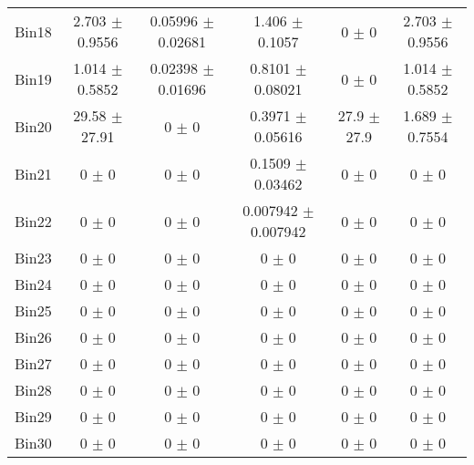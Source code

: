 \begin{tabular}{@{\extracolsep{4pt}}lccccc@{}}
     Bin18 & 2.703 $\pm$ 0.9556 & 0.05996 $\pm$ 0.02681 & 1.406 $\pm$ 0.1057 & 0 $\pm$ 0 & 2.703 $\pm$ 0.9556 \\ 
     Bin19 & 1.014 $\pm$ 0.5852 & 0.02398 $\pm$ 0.01696 & 0.8101 $\pm$ 0.08021 & 0 $\pm$ 0 & 1.014 $\pm$ 0.5852 \\ 
     Bin20 & 29.58 $\pm$ 27.91 & 0 $\pm$ 0 & 0.3971 $\pm$ 0.05616 & 27.9 $\pm$ 27.9 & 1.689 $\pm$ 0.7554 \\ 
     Bin21 & 0 $\pm$ 0 & 0 $\pm$ 0 & 0.1509 $\pm$ 0.03462 & 0 $\pm$ 0 & 0 $\pm$ 0 \\ 
     Bin22 & 0 $\pm$ 0 & 0 $\pm$ 0 & 0.007942 $\pm$ 0.007942 & 0 $\pm$ 0 & 0 $\pm$ 0 \\ 
     Bin23 & 0 $\pm$ 0 & 0 $\pm$ 0 & 0 $\pm$ 0 & 0 $\pm$ 0 & 0 $\pm$ 0 \\ 
     Bin24 & 0 $\pm$ 0 & 0 $\pm$ 0 & 0 $\pm$ 0 & 0 $\pm$ 0 & 0 $\pm$ 0 \\ 
     Bin25 & 0 $\pm$ 0 & 0 $\pm$ 0 & 0 $\pm$ 0 & 0 $\pm$ 0 & 0 $\pm$ 0 \\ 
     Bin26 & 0 $\pm$ 0 & 0 $\pm$ 0 & 0 $\pm$ 0 & 0 $\pm$ 0 & 0 $\pm$ 0 \\ 
     Bin27 & 0 $\pm$ 0 & 0 $\pm$ 0 & 0 $\pm$ 0 & 0 $\pm$ 0 & 0 $\pm$ 0 \\ 
     Bin28 & 0 $\pm$ 0 & 0 $\pm$ 0 & 0 $\pm$ 0 & 0 $\pm$ 0 & 0 $\pm$ 0 \\ 
     Bin29 & 0 $\pm$ 0 & 0 $\pm$ 0 & 0 $\pm$ 0 & 0 $\pm$ 0 & 0 $\pm$ 0 \\ 
     Bin30 & 0 $\pm$ 0 & 0 $\pm$ 0 & 0 $\pm$ 0 & 0 $\pm$ 0 & 0 $\pm$ 0 \\ 
\hline\hline
  \end{tabular}
